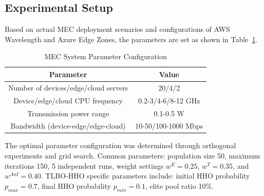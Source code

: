 \documentclass[conference]{IEEEtran}
\begin{document}
\subsection{Experimental Setup}
Based on actual MEC deployment scenarios and configurations of AWS Wavelength and Azure Edge Zones, the parameters are set as shown in Table~\ref{tab:system}.

\begin{table}[!t]
\small
\centering
\caption{MEC System Parameter Configuration}
\label{tab:system}
\begin{tabular}{|c|c|}
\hline
\textbf{Parameter} & \textbf{Value} \\
\hline
Number of devices/edge/cloud servers & 20/4/2 \\
Device/edge/cloud CPU frequency & 0.2-3/4-6/8-12 GHz \\
Transmission power range & 0.1-0.5 W \\
Bandwidth (device-edge/edge-cloud) & 10-50/100-1000 Mbps \\
\hline
\end{tabular}
\end{table}

\begin{table}[!t]
  \scriptsize
  \setlength{\tabcolsep}{4pt}
  \centering
  \caption{Task Type Distribution and Characteristics}
  \label{tab:task}
\end{table}

The optimal parameter configuration was determined through orthogonal experiments and grid search. Common parameters: population size 50, maximum iterations 150, 5 independent runs, weight settings $w^E = 0.25$, $w^T = 0.35$, and $w^{AoI} = 0.40$. TLBO-HHO specific parameters include: initial HHO probability $p_{max} = 0.7$, final HHO probability $p_{min} = 0.1$, elite pool ratio 10\%.
\end{document}

